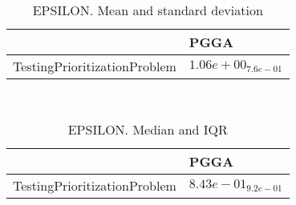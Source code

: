 \documentclass{article}
\begin{document}
\
\begin{table}
\caption{EPSILON. Mean and standard deviation}
\label{table:mean.EPSILON}
\centering
\begin{scriptsize}
\begin{tabular}{ll}
\hline &  PGGA\\
\hline
TestingPrioritizationProblem & \cellcolor{gray95}$  1.06e+00_{ 7.6e-01}$ \\
\hline
\end{tabular}
\end{scriptsize}
\end{table}
\
\begin{table}
\caption{EPSILON. Median and IQR}
\label{table:median.EPSILON}
\begin{scriptsize}
\centering
\begin{tabular}{ll}
\hline &  PGGA\\
\hline
TestingPrioritizationProblem & \cellcolor{gray95}$  8.43e-01_{ 9.2e-01}$ \\
\hline
\end{tabular}
\end{scriptsize}
\end{table}
\end{document}
